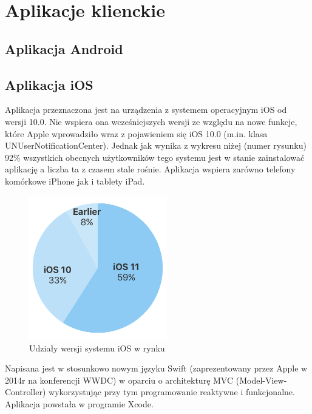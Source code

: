 \chapter{Aplikacje klienckie}

\section*{Aplikacja Android}

\section*{Aplikacja iOS}
Aplikacja przeznaczona jest na urządzenia z systemem operacyjnym iOS od wersji 10.0. 
Nie wspiera ona wcześniejszych wersji ze względu na nowe funkcje, które Apple wprowadziło wraz z pojawieniem się iOS 10.0 (m.in. klasa UNUserNotificationCenter). Jednak jak wynika z wykresu niżej (numer rysunku) 92\% wszystkich obecnych użytkowników tego systemu jest w stanie zainstalować aplikację a liczba ta z czasem stale rośnie. Aplikacja wspiera zarówno telefony komórkowe iPhone jak i tablety iPad. 
\begin{figure}[h]
	\centering
	\includegraphics[width=6cm]{iOSstat}
	\caption{Udziały wersji systemu iOS w rynku}
\end{figure}
Napisana jest w stosunkowo nowym języku Swift (zaprezentowany przez Apple w 2014r na konferencji WWDC) w oparciu o architekturę MVC (Model-View-Controller) wykorzystując przy tym programowanie reaktywne i funkcjonalne. Aplikacja powstała w programie Xcode.
